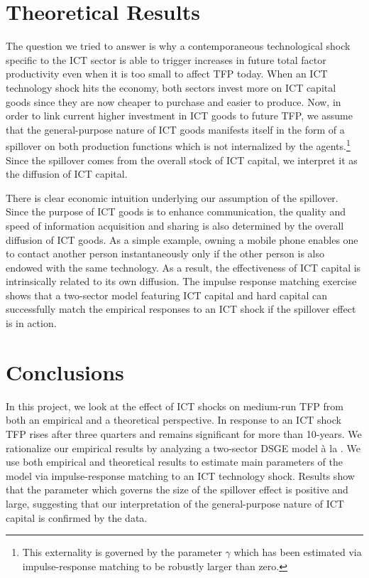 \documentclass[a0,landscape]{a0poster}
\begin{document}
\begin{multicols}{4}
\section*{Theoretical Results}

The question we tried to answer is why a contemporaneous technological shock specific to the ICT sector is able to trigger increases in future total factor productivity even when it is too small to affect TFP today. When an ICT technology shock hits the economy, both sectors invest more on ICT capital goods since they are now cheaper to purchase and easier to produce. Now, in order to link current higher investment in ICT goods to future TFP, we assume that the general-purpose nature of ICT goods manifests itself in the form of a spillover on both production functions which is not internalized by the agents.\footnote{This externality is governed by the parameter $\gamma$ which has been estimated via impulse-response matching to be robustly larger than zero.} Since the spillover comes from the overall stock of ICT capital, we interpret it as the diffusion of ICT capital.

There is clear economic intuition underlying our assumption of the spillover. Since the purpose of ICT goods is to enhance communication, the quality and speed of information acquisition and sharing is also determined by the overall diffusion of ICT goods. As a simple example, owning a mobile phone enables one to contact another person instantaneously only if the other person is also endowed with the same technology. As a result, the effectiveness of ICT capital is intrinsically related to its own diffusion. The impulse response matching exercise shows that a two-sector model featuring ICT capital and hard capital can successfully match the empirical responses to an ICT shock if the spillover effect is in action. 






\section*{Conclusions}

In this project, we look at the effect of ICT shocks on medium-run TFP from both an empirical and a theoretical perspective. In response to an ICT shock TFP rises after three quarters and remains significant for more than 10-years. We rationalize our empirical results by analyzing a two-sector DSGE model \`a la \cite{greenwood1997long}. We use both empirical and theoretical results to estimate main parameters of the model via impulse-response matching to an ICT technology shock. Results show that the parameter which governs the size of the spillover effect is positive and large, suggesting that our interpretation of the general-purpose nature of ICT capital is confirmed by the data.


\end{multicols}
\end{document}
